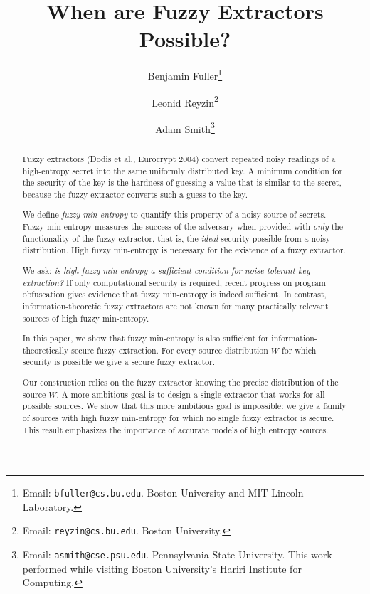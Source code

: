 \documentclass[11pt]{article}
\title{When are Fuzzy Extractors Possible?}
\author{
Benjamin Fuller\footnote{Email: {\tt bfuller@cs.bu.edu}.  Boston
  University and MIT Lincoln Laboratory.}  \and Leonid
Reyzin\footnote{Email: {\tt reyzin@cs.bu.edu}.  Boston University.}
\and Adam Smith\footnote{Email: {\tt asmith@cse.psu.edu}.
  Pennsylvania State University. This work performed while visiting Boston
  University's Hariri Institute for Computing.}}
\author{}\institute{}
\begin{document}
\maketitle

\begin{abstract}
Fuzzy extractors (Dodis et al., Eurocrypt 2004) convert repeated noisy
readings of a high-entropy secret into the same uniformly distributed
key. A minimum condition for the security of the key is the hardness
of guessing a value that is similar to the secret, because the fuzzy
extractor converts such a guess to the key.

We define \emph{fuzzy min-entropy} to quantify this property of a noisy source of secrets.  Fuzzy min-entropy measures the success of the adversary when provided with \emph{only} the functionality of the fuzzy extractor, that is, the \emph{ideal} security possible from a noisy distribution.  
High fuzzy min-entropy is necessary for the existence of a fuzzy
extractor. 

We ask: \emph{is high fuzzy min-entropy a
  sufficient condition for noise-tolerant key extraction?}
If only computational security is required, recent progress on program
obfuscation gives evidence that fuzzy
min-entropy is indeed sufficient. In contrast,
information-theoretic fuzzy extractors are not known for many
practically relevant sources of high fuzzy min-entropy. 

In this paper, we show that fuzzy min-entropy is also sufficient for
information-theoretically secure fuzzy extraction. For every source
distribution $W$ for which security is possible we give a secure fuzzy
extractor. 

Our construction relies on the fuzzy extractor knowing the precise
distribution of the source $W$.  A more ambitious goal is to design a
single extractor that works for all possible sources.  We show that
this more ambitious goal is impossible: we give a family of sources
with high fuzzy min-entropy for which no single fuzzy extractor is
secure.  This result emphasizes the importance of accurate models
of high entropy sources.



\end{abstract}
\end{document}
